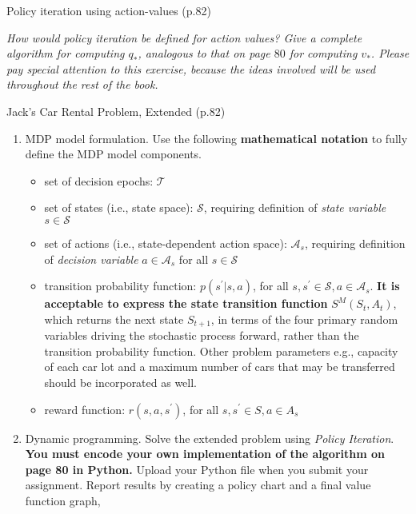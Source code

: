 \documentclass[12pt,letterpaper]{exam}
\begin{document}
\begin{questions}
	\setcounter{question}{5-1}%
	\question%
	Policy iteration using action-values (p.82)
	
	\emph{How would policy iteration be defined for action values? Give a complete algorithm for computing 
	\(q_*\), analogous to that on page \(80\) for computing \(v_*\). 
	Please pay special attention to this exercise, because the ideas involved will be used throughout the rest of the book.}
	\begin{solution}
	\end{solution}

	\setcounter{question}{6}
	\question%
	Jack's Car Rental Problem, Extended (p.82)
	\begin{enumerate}[label= (\alph*)]
		\item 
		MDP model formulation. 
		Use the following \textbf{mathematical notation} to fully define the MDP model components.
		\begin{itemize}
			\item set of decision epochs: \(\mathcal{T}\)
			\item set of states (i.e., state space): \(\mathcal{S}\), 
			requiring definition of \emph{state variable} \(s \in \mathcal{S}\)
			\item set of actions (i.e., state-dependent action space): \(\mathcal{A}_s\), 
			requiring definition of \emph{decision variable} \(a\in\mathcal{A}_s\) for all \(s\in\mathcal{S}\)
			\item transition probability function: \(p(s^\prime|s, a)\), 
			for all \(s, s^\prime \in \mathcal{S}, a \in \mathcal{A}_s\). 
			\textbf{It is acceptable to express the state transition function} \(S^M(S_t, A_t)\), 
			which returns the next state \(S_{t+1}\), in terms of the four primary random variables driving the stochastic process forward, 
			rather than the transition probability function. Other problem parameters \- e.g., capacity of each car lot
			and a maximum number of cars that may be transferred \- should be incorporated as well.
			\item reward function: \(r(s, a, s^\prime)\), for all \(s, s^\prime \in S, a \in A_s\)
		\end{itemize}
		\item 
		Dynamic programming. Solve the extended problem using \emph{Policy Iteration}. 
		\textbf{You must encode your own implementation of the algorithm on page 80 in Python.} 
		Upload your Python file when you submit your assignment. 
		Report results by creating a policy chart and a final value function graph, 

\end{enumerate}
\end{questions}
\end{document}
